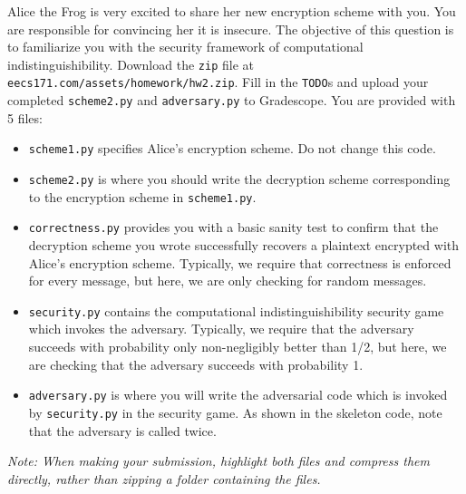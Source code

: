 \documentclass[11pt]{article}
\begin{document}
Alice the Frog is very excited to share her new encryption scheme with you. You are responsible for convincing her it is insecure. The objective of this question is to familiarize you with the security framework of computational indistinguishibility. Download the \texttt{zip} file at \texttt{eecs171.com/assets/homework/hw2.zip}. Fill in the 
\texttt{TODO}s and upload your completed \texttt{scheme2.py} and \texttt{adversary.py} to Gradescope. You are provided with 5 files:
\begin{itemize}
    \item \texttt{scheme1.py} specifies Alice's encryption scheme. Do not change this code.
    \item \texttt{scheme2.py} is where you should write the decryption scheme corresponding to the encryption scheme in \texttt{scheme1.py}.
    \item \texttt{correctness.py} provides you with a basic sanity test to confirm that the decryption scheme you wrote successfully recovers a plaintext encrypted with Alice's encryption scheme. Typically, we require that correctness is enforced for every message, but here, we are only checking for random messages.
    \item \texttt{security.py} contains the computational indistinguishibility security game which invokes the adversary. Typically, we require that the adversary succeeds with probability only non-negligibly better than 1/2, but here, we are checking that the adversary succeeds with probability 1.
    \item \texttt{adversary.py} is where you will write the adversarial code which is invoked by \texttt{security.py} in the security game. As shown in the skeleton code, note that the adversary is called twice.
\end{itemize}

\noindent \textit{Note: When making your submission, highlight both files and compress them directly, rather than zipping a folder containing the files.}
\end{document}

